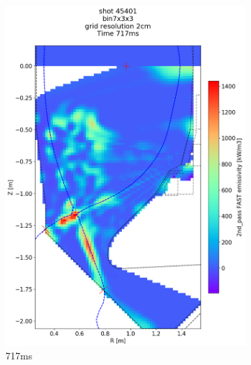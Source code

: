 \begin{figure}
\begin{subfigure}{0.395\linewidth}
         \includegraphics[trim={75 90 0 190},clip,width=\textwidth]{Chapters/chapter2/figs/IRVB-MASTU_shot-45401_export_89.png}
         \vspace*{-6.5mm}
         \caption{717ms}
         \label{fig:45401_export2_3}
     \end{subfigure}
     \begin{subfigure}{0.395\linewidth}
         \centering

\end{subfigure}
\end{figure}
